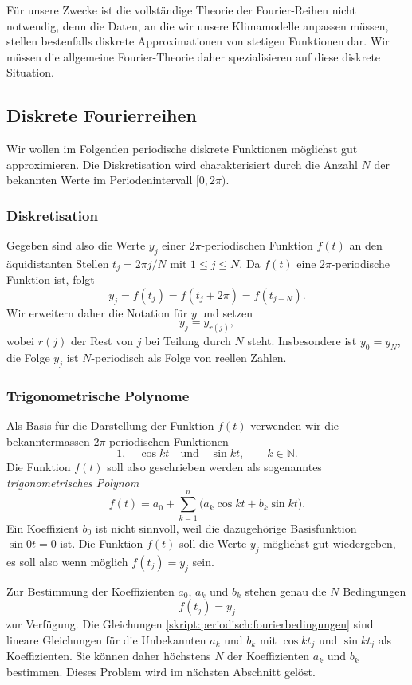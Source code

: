 Für unsere Zwecke ist die vollständige Theorie der Fourier-Reihen nicht
notwendig, denn die Daten, an die wir unsere Klimamodelle anpassen
müssen, stellen bestenfalls diskrete Approximationen von stetigen
Funktionen dar.
Wir müssen die allgemeine Fourier-Theorie daher spezialisieren auf diese
diskrete Situation.

\subsection{Diskrete Fourierreihen}
Wir wollen im Folgenden periodische diskrete Funktionen möglichst gut
approximieren.
Die Diskretisation wird charakterisiert durch die Anzahl
$N$ der bekannten Werte im Periodenintervall $[0,2\pi)$.

\subsubsection{Diskretisation}
Gegeben sind also die Werte $y_j$ einer $2\pi$-periodischen Funktion
$f(t)$ an den äquidistanten Stellen $t_j=2\pi j/N$ mit
$1\le j \le N$.
Da $f(t)$ eine $2\pi$-periodische Funktion ist, folgt
\[
y_j = f(t_j) = f(t_j+2\pi) = f(t_{j+N}).
\]
Wir erweitern daher die Notation für $y$ und setzen
\[
y_j = y_{r(j)},
\]
wobei $r(j)$ der Rest von $j$ bei Teilung durch $N$ steht.
Insbesondere ist $y_0=y_N$, die Folge $y_j$ ist $N$-periodisch als
Folge von reellen Zahlen.

\subsubsection{Trigonometrische Polynome}
Als Basis für die Darstellung der Funktion $f(t)$ verwenden wir
die bekanntermassen
$2\pi$-periodischen Funktionen 
\begin{equation}
1,\quad \cos kt\quad\text{und}\quad \sin kt,\qquad k\in\mathbb N.
\end{equation}
Die Funktion $f(t)$ soll also geschrieben werden als sogenanntes 
{\em trigonometrisches Polynom}
%
\begin{equation}
f(t)
=
a_0 + \sum_{k=1}^n \bigl(a_k \cos kt + b_k\sin kt).
\label{skript:fourier:rekonstruktion}
\end{equation}
Ein Koeffizient $b_0$ ist nicht sinnvoll, weil die dazugehörige Basisfunktion
$\sin 0t =0$ ist.
Die Funktion $f(t)$ soll die Werte $y_j$
möglichst gut wiedergeben, es soll also wenn möglich $f(t_j) = y_j$ sein.

Zur Bestimmung der Koeffizienten $a_0$, $a_k$ und $b_k$ stehen genau
die $N$ Bedingungen
\begin{equation}
f(t_j)=y_j
\label{skript:periodisch:fourierbedingungen}
\end{equation}
zur Verfügung.
Die Gleichungen \eqref{skript:periodisch:fourierbedingungen} sind
lineare Gleichungen für die Unbekannten $a_k$ und $b_k$ mit
$\cos kt_j$ und $\sin kt_j$ als Koeffizienten.
Sie können daher höchstens $N$ der Koeffizienten $a_k$ und $b_k$
bestimmen.
Dieses Problem wird im nächsten Abschnitt gelöst.

